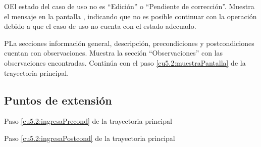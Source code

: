  \begin{UCtrayectoriaA}{O}{El estado del caso de uso no es ``Edición'' o ``Pendiente de corrección''.}
    \UCpaso[\UCsist] Muestra el mensaje  en la pantalla , indicando que no es posible
	continuar con la operación debido a que el caso de uso no cuenta con el estado adecuado.
 \end{UCtrayectoriaA}
 \begin{UCtrayectoriaA}{P}{La secciones información general, descripción, precondiciones y postcondiciones cuentan con observaciones.}
    \UCpaso[\UCsist] Muestra la sección ``Observaciones'' con las observaciones encontradas.
	\UCpaso[] Continúa con el paso \ref{cu5.2:muestraPantalla} de la trayectoria principal.
 \end{UCtrayectoriaA}
 

 

\subsection{Puntos de extensión}	
	{Paso \ref{cu5.2:ingresaPrecond} de la trayectoria principal}
	{}
	
	{Paso \ref{cu5.2:ingresaPostcond} de la trayectoria principal}
	{}